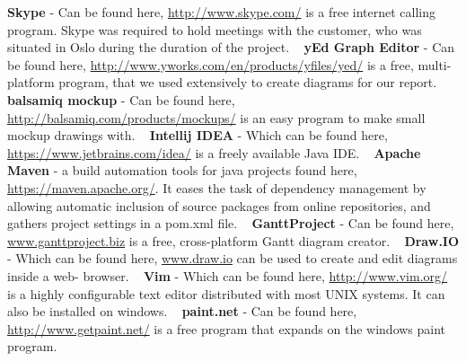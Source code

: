 \documentclass[../document]{subfiles}
\begin{document}
\textbf{Skype} - Can be found here, \url{http://www.skype.com/} is a free internet calling program. Skype was required to hold meetings with the customer, who was situated in Oslo during the duration of the project.
\newline \ \newline
\textbf{yEd Graph Editor} - Can be found here, \url{http://www.yworks.com/en/products/yfiles/yed/} is a free, multi-platform program, that we used extensively to create diagrams for our report.
\newline \ \newline
\textbf{balsamiq mockup} - Can be found here, \url{http://balsamiq.com/products/mockups/} is an easy program to make small mockup drawings with. 
\newline \ \newline
\textbf{Intellij IDEA} - Which can be found here, \url{https://www.jetbrains.com/idea/} is a freely available Java IDE.
\newline \ \newline
\textbf{Apache Maven} - a build automation tools for java projects found here, \url{https://maven.apache.org/}. It eases the task of dependency management by allowing automatic inclusion of source packages from online repositories, and gathers project settings in a pom.xml file.
\newline \ \newline
\textbf{GanttProject} - Can be found here, \url{www.ganttproject.biz} is a free, cross-platform Gantt diagram creator.
\newline \ \newline
\textbf{Draw.IO} - Which can be found here, \url{www.draw.io} can be used to create and edit diagrams inside a web- browser.
\newline \ \newline
\textbf{Vim} - Which can be found here, \url{http://www.vim.org/} is a highly configurable text editor distributed with most UNIX systems. It can also be installed on windows.
\newline \ \newline
\textbf{paint.net} - Can be found here, \url{http://www.getpaint.net/} is a free program that expands on the windows paint program. 
\end{document}
